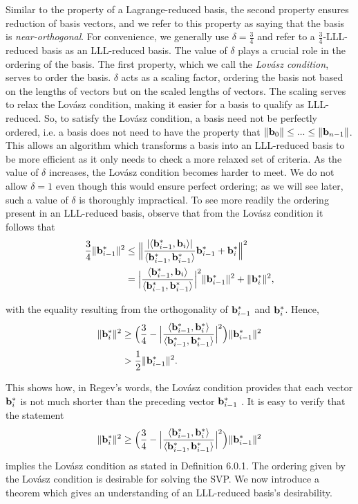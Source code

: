 \documentclass[a4paper,12pt]{article}
\begin{document}
Similar to the property of a Lagrange-reduced basis, the second property ensures reduction of basis vectors, and we refer to this property as saying that the basis is \textit{near-orthogonal}. For convenience, we generally use $\delta = \frac{3}{4}$ and refer to a $\frac{3}{4}$-LLL-reduced basis as an LLL-reduced basis. The value of $\delta$ plays a crucial role in the ordering of the basis. The first property, which we call the \textit{Lov\'asz condition}, serves to order the basis. $\delta$ acts as a scaling factor, ordering the basis not based on the lengths of vectors but on the scaled lengths of vectors. The scaling serves to relax the Lov\'asz condition, making it easier for a basis to qualify as LLL-reduced. So, to satisfy the Lov\'asz condition, a basis need not be perfectly ordered, i.e. a basis does not need to have the property that $\|\mathbf{b}_{0}\| \leq ...\leq \|\mathbf{b}_{n-1}\|$. This allows an algorithm which transforms a basis into an LLL-reduced basis to be more efficient as it only needs to check a more relaxed set of criteria. As the value of $\delta$ increases, the Lov\'asz condition becomes harder to meet. We do not allow $\delta = 1$ even though this would ensure perfect ordering; as we will see later, such a value of $\delta$ is thoroughly impractical. To see more readily the ordering present in an LLL-reduced basis, observe that from the Lov\'asz condition it follows that 
\begin{align*}
\frac{3}{4} \| \mathbf{b}_{i-1}^{*} \|^2 &\leq \Big\| \frac{| \langle \mathbf{b}_{i-1}^{*}, \mathbf{b}_{i} \rangle |}{\langle \mathbf{b}_{i-1}^{*}, \mathbf{b}_{i-1}^{*} \rangle}\mathbf{b}_{i-1}^{*} + \mathbf{b}_{i}^{*} \Big\|^2 \\
&= \Big |\frac{\langle \mathbf{b}_{i-1}^{*}, \mathbf{b}_{i}\rangle}{\langle \mathbf{b}_{i-1}^{*}, \mathbf{b}_{i-1}^{*} \rangle}\Big|^{2}\|\mathbf{b}_{i-1}^{*}\|^{2} + \| \mathbf{b}_{i}^{*} \|^{2},
\end{align*}

with the equality resulting from the orthogonality of $\mathbf{b}_{i-1}^{*}$ and $\mathbf{b}_{i}^{*}$. Hence, 
\begin{align*}
\|\mathbf{b}_{i}^{*}\|^2 &\geq \Big (\frac{3}{4} - \Big|\frac{\langle \mathbf{b}_{i-1}^{*}, \mathbf{b}_{i}^{*} \rangle}{\langle \mathbf{b}_{i-1}^{*}, \mathbf{b}_{i-1}^{*} \rangle}\Big|^{2} \Big )\| \mathbf{b}_{i-1}^{*} \|^2 \\
&> \frac{1}{2}\| \mathbf{b}_{i-1}^{*} \|^2.
\end{align*}

This shows how, in Regev's words, the Lov\'asz condition provides that each vector $\mathbf{b}_{i}^*$ is not much shorter than the preceding vector $\mathbf{b}_{i-1}^*$ \cite{Regev}. It is easy to verify that the statement $$\|\mathbf{b}_{i}^{*}\|^2 \geq \Big (\frac{3}{4} - \Big|\frac{\langle \mathbf{b}_{i-1}^{*}, \mathbf{b}_{i}^{*} \rangle}{\langle \mathbf{b}_{i-1}^{*}, \mathbf{b}_{i-1}^{*} \rangle}\Big|^{2} \Big )\| \mathbf{b}_{i-1}^{*} \|^2$$  implies the Lov\'asz condition as stated in Definition 6.0.1. The ordering given by the Lov\'asz condition is desirable for solving the SVP. We now introduce a theorem which gives an understanding of an LLL-reduced basis's desirability.
\end{document}
